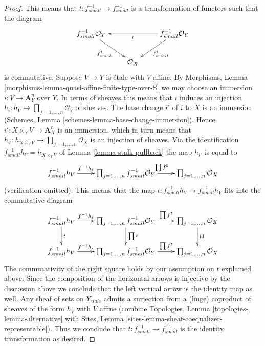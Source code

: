 \documentclass[10pt,a4paper]{amsart}
\theoremstyle{plain}
\theoremstyle{definition}
\theoremstyle{remark}
\numberwithin{equation}{subsection}
\def\etale{{\acute{e}tale}}
\begin{document}
\begin{proof}
This means that $t : f^{-1}_{small} \to f^{-1}_{small}$
is a transformation of functors such that the diagram
$$
\xymatrix{
f_{small}^{-1}\mathcal{O}_Y
\ar[rd]_{f_{small}^\sharp}  & &
f_{small}^{-1}\mathcal{O}_Y \ar[ll]^t \ar[ld]^{f_{small}^\sharp} \\
& \mathcal{O}_X
}
$$
is commutative. Suppose $V \to Y$ is \'etale with $V$ affine. By
Morphisms, Lemma \ref{morphisms-lemma-quasi-affine-finite-type-over-S}
we may choose an immersion $i : V \to \mathbf{A}^n_Y$ over $Y$.
In terms of sheaves this means that $i$ induces an injection
$h_i : h_V \to \prod_{j = 1, \ldots, n} \mathcal{O}_Y$ of sheaves.
The base change $i'$ of $i$ to $X$ is an immersion
(Schemes, Lemma \ref{schemes-lemma-base-change-immersion}).
Hence $i' : X \times_Y V \to \mathbf{A}^n_X$ is an immersion, which
in turn means that
$h_{i'} : h_{X \times_Y V} \to \prod_{j = 1, \ldots, n} \mathcal{O}_X$
is an injection of sheaves.
Via the identification $f_{small}^{-1}h_V = h_{X \times_Y V}$ of
Lemma \ref{lemma-stalk-pullback}
the map $h_{i'}$ is equal to
$$
\xymatrix{
f_{small}^{-1}h_V \ar[r]^-{f^{-1}h_i} &
\prod_{j = 1, \ldots, n} f_{small}^{-1}\mathcal{O}_Y
\ar[r]^{\prod f^\sharp} &
\prod_{j = 1, \ldots, n} \mathcal{O}_X
}
$$
(verification omitted). This means that the map
$t : f_{small}^{-1}h_V \to f_{small}^{-1}h_V$
fits into the commutative diagram
$$
\xymatrix{
f_{small}^{-1}h_V \ar[r]^-{f^{-1}h_i} \ar[d]^t &
\prod_{j = 1, \ldots, n} f_{small}^{-1}\mathcal{O}_Y
\ar[r]^-{\prod f^\sharp} \ar[d]^{\prod t} &
\prod_{j = 1, \ldots, n} \mathcal{O}_X \ar[d]^{\text{id}}\\
f_{small}^{-1}h_V \ar[r]^-{f^{-1}h_i} &
\prod_{j = 1, \ldots, n} f_{small}^{-1}\mathcal{O}_Y
\ar[r]^-{\prod f^\sharp} &
\prod_{j = 1, \ldots, n} \mathcal{O}_X
}
$$
The commutativity of the right square holds by our assumption on $t$
explained above.
Since the composition of the horizontal arrows is injective
by the discussion above we conclude that the left vertical arrow
is the identity map as well. Any sheaf of sets on
$Y_\etale$ admits a surjection from a (huge) coproduct of sheaves
of the form $h_V$ with $V$ affine (combine
Topologies, Lemma \ref{topologies-lemma-alternative}
with
Sites, Lemma \ref{sites-lemma-sheaf-coequalizer-representable}).
Thus we conclude that $t : f_{small}^{-1} \to f_{small}^{-1}$
is the identity transformation as desired.
\end{proof}
\end{document}
